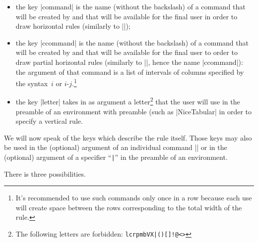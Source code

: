 \documentclass[dvipsnames]{article}%
\begin{document}
\begin{itemize}
\item the key |command| is the name (without the backslash) of a command that
will be created by  and that will be available for the final
user in order to draw horizontal rules (similarly to |\hline|);

\item the key |ccommand| is the name (without the backslash) of a command
that will be created by  and that will be available for the
final user to order to draw partial horizontal rules (similarly to |\cline|,
hence the name |ccommand|): the argument of that command is a list of
intervals of columns specified by the syntax~$i$ or $i$-$j$.\footnote{It's
recommended to use such commands only once in a row because each use will
create space between the rows corresponding to the total width of the rule.}

\item the key |letter| takes in as argument a letter\footnote{The following
letters are forbidden: \verb+lcrpmbVX|()[]!@<>+} that the user will use in
the preamble of an environment with preamble (such as |{NiceTabular}| in order
to specify a vertical rule.
\end{itemize}

\bigskip
We will now speak of the keys which describe the rule itself. Those keys may
also be used in the (optional) argument of an individual command |\Hline| or in
the (optional) argument of a specifier ``\verb+|+'' in the preamble of an
environment. 

\bigskip
There is three possibilities.
\end{document}

